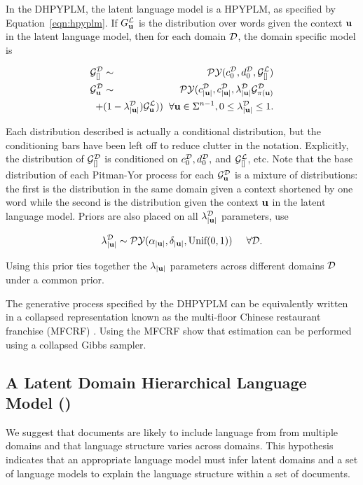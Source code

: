 In the DHPYPLM, the latent language model is a HPYPLM, as specified by Equation~\ref{eqn:hpyplm}.  If $G^\LA_\bu$ is the distribution over words given the context $\bu$ in the latent language model, then for each domain $\D$,  the domain specific model is

\begin{eqnarray}
\G^\D_{[]} &\sim& \PY(c^\D_0, d^\D_0,\G^\LA_{[]}) \nonumber \\
\G^\D_\bu &\sim& \PY(c^\D_{|\bu|}, c^\D_{|\bu|}, \lambda^\D_{|\bu|}\G^\D_{\pi(\bu)} \nonumber \\
&& \hspace{-1cm} + (1-\lambda^\D_{|\bu|})\G^\LA_\bu))  \hspace{.2cm} \forall \bu \in \Sigma^{n-1}, 0 \leq \lambda^\D_{|\bu|} \leq 1. \nonumber
\end{eqnarray}

Each distribution described is actually a conditional distribution, but the conditioning bars have been left off to reduce clutter in the notation.  Explicitly, the distribution of $\G^\D_{[]}$ is conditioned on $c^\D_0, d^\D_0,$ and $\G^\LA_{[]}$, etc.  Note that the base distribution of each Pitman-Yor process for each $\G^\D_\bu$ is a mixture of distributions: the first is the distribution in the same domain given a context shortened by one word while the second is the distribution given the context $\bu$ in the latent language model. Priors are also placed on all $\lambda^\D_{|\bu|}$ parameters, \cite{Wood2009a} use

$$\lambda^\D_{|\bu|} \sim \PY(\alpha_{|\bu|}, \delta_{|\bu|}, \textrm{Unif}(0,1))  \hspace{.5cm} \forall \D.$$

Using this prior ties together the $\lambda_{|\bu|}$ parameters across different domains $\D$ under a common prior.

The generative process specified by the  DHPYPLM can be equivalently written in a collapsed representation known as the multi-floor Chinese restaurant franchise (MFCRF) \cite{Wood2009a}.  Using the MFCRF \cite{Wood2009a} show that estimation can be performed using a collapsed Gibbs sampler.

\subsection{A Latent Domain Hierarchical Language Model (\ourmodel)}

We suggest that documents are likely to include language from from multiple domains and that language structure varies across domains. This hypothesis indicates that an appropriate language model must infer latent domains and a set of language models to explain the language structure within a set of documents.

